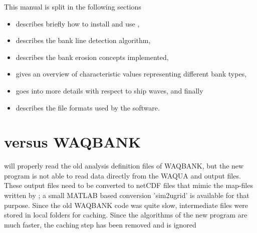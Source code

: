 This manual is split in the following sections

\begin{itemize}
\item {} describes briefly how to install and use \dfastbe,
\item {} describes the bank line detection algorithm,
\item {} describes the bank erosion concepts implemented,
\item {} gives an overview of characteristic values representing different bank types,
\item {} goes into more details with respect to ship waves, and finally
\item {} describes the file formats used by the software.
\end{itemize}

\section{\dfastbe versus WAQBANK}

\dfastbe will properly read the old analysis definition files of WAQBANK, but the new program is not able to read data directly from the WAQUA and \dflow output files.
These output files need to be converted to netCDF files that mimic the map-files written by \dflowfm; a small MATLAB based conversion 'sim2ugrid' is available for that purpose.
Since the old WAQBANK code was quite slow, intermediate files were stored in local folders for caching.
Since the algorithms of the new \dfastbe program are much faster, the caching step has been removed and  is ignored
